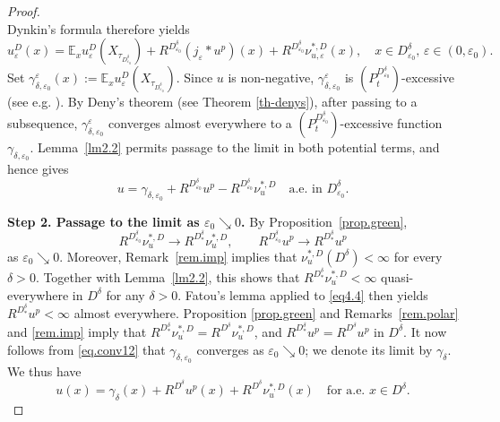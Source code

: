 \documentclass[11pt,a4paper,reqno]{amsart}
\theoremstyle{definition}
\numberwithin{equation}{section}
\begin{document}
\begin{proof}
\[\]
Dynkin's formula \cite[Theorem~3.9.4]{Kolokoltsov} therefore yields    
\[
u^D_\varepsilon(x)= \mathbb E_xu^D_\varepsilon(X_{\tau_{D_{\varepsilon_0}^\delta}})+R^{D_{\varepsilon_0}^\delta} (j_\varepsilon\ast u^p)(x)+R^{D_{\varepsilon_0}^\delta}\nu^{*,D}_{u,\varepsilon}(x),\quad x\in D_{\varepsilon_0}^\delta,\, \varepsilon \in (0,\varepsilon_0).
\]
Set $\gamma^\varepsilon_{\delta,\varepsilon_0}(x):=  \mathbb E_xu^D_\varepsilon(X_{\tau_{D_{\varepsilon_0}^\delta}})$.
Since $u$ is non-negative, $\gamma^\varepsilon_{\delta,\varepsilon_0}$
is $(P^{D_{\varepsilon_0}^\delta}_t)$-excessive (see e.g. \cite[Proposition II.2.8]{BG}). 
By Deny's theorem (see Theorem \ref{th-denys}), after passing to a subsequence, \(\gamma_{\delta,\varepsilon_0}^{\varepsilon}\) 
converges almost everywhere to a \((P_t^{D_{\varepsilon_0}^\delta})\)-excessive function \(\gamma_{\delta,\varepsilon_0}\). 
Lemma~\ref{lm2.2} permits passage to the limit in both potential terms, and hence gives  
\begin{equation}
\label{eq4.4}
u=\gamma_{\delta,\varepsilon_0}+R^{D_{\varepsilon_0}^\delta}u^p-R^{D_{\varepsilon_0}^\delta}\nu^{*,D}_{u}\quad\text{a.e. in }D_{\varepsilon_0}^\delta.
\end{equation}


\medskip 
\noindent 
\textbf{Step 2. Passage to the limit as \(\varepsilon_0\searrow0\).} 
By Proposition~\ref{prop.green},
\begin{equation}
\label{eq.conv12}
R^{D_{\varepsilon_0}^\delta}\nu^{*,D}_{u}\to
R^{D^\delta_*}\nu^{*,D}_{u},\qquad R^{D_{\varepsilon_0}^\delta}u^p\to R^{D^\delta_*}u^p
\end{equation}
as $\varepsilon_0\searrow 0$. 
Moreover, Remark~\ref{rem.imp} implies that \(\nu_u^{*,D}(D^\delta)<\infty\) for every \(\delta>0\). 
Together with Lemma~\ref{lm2.2}, this shows that \(R^{D_*^\delta}\nu_u^{*,D}<\infty\) quasi-everywhere in \(D^\delta\) for any $\delta>0$. 
Fatou's lemma applied to \eqref{eq4.4} then yields \(R^{D_*^\delta}u^p<\infty\) almost everywhere. 
Proposition \ref{prop.green} and Remarks~\ref{rem.polar} and \ref{rem.imp} 
imply that  $R^{D_*^\delta}\nu^{*,D}_{u}=R^{D^\delta}\nu^{*,D}_{u}$,
and $R^{D_*^\delta}u^p=R^{D^\delta}u^p$  in $D^\delta$.  It now follows from \eqref{eq.conv12} that \(\gamma_{\delta,\varepsilon_0}\) 
converges as \(\varepsilon_0\searrow0\); we denote its limit by \(\gamma_\delta\).
We thus have
\begin{equation}
\label{eq4.5}
 u(x)=\gamma_{\delta}(x)+R^{D^\delta}u^p(x)+R^{D^\delta}\nu^{*,D}_{u}(x)\quad \text{for a.e. }x\in D^\delta.
\end{equation}



\end{proof}
\end{document}

